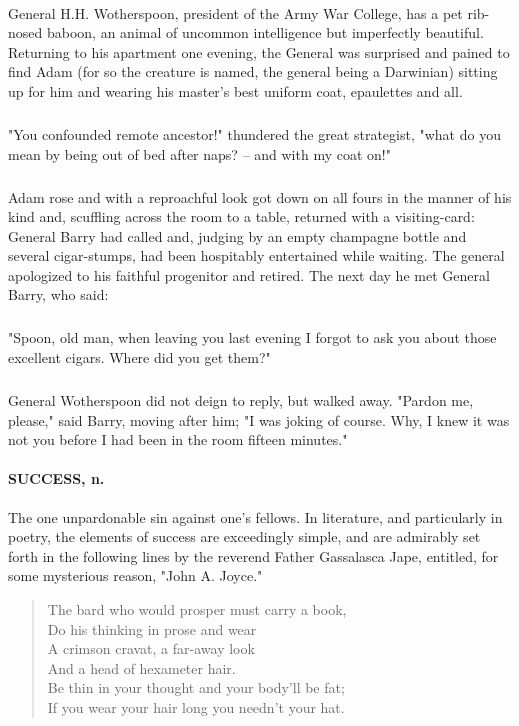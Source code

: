 \documentclass[11pt]{article}
\begin{document}
\paragraph{}   General H.H. Wotherspoon, president of the Army War College, has a 
pet rib-nosed baboon, an animal of uncommon intelligence but 
imperfectly beautiful.  Returning to his apartment one evening, the
General was surprised and pained to find Adam (for so the creature is
named, the general being a Darwinian) sitting up for him and wearing
his master's best uniform coat, epaulettes and all.
\subparagraph{}   "You confounded remote ancestor!" thundered the great strategist, 
"what do you mean by being out of bed after naps? -- and with my coat 
on!"
\subparagraph{}   Adam rose and with a reproachful look got down on all fours in the 
manner of his kind and, scuffling across the room to a table, returned 
with a visiting-card:  General Barry had called and, judging by an
empty champagne bottle and several cigar-stumps, had been hospitably
entertained while waiting.  The general apologized to his faithful
progenitor and retired.  The next day he met General Barry, who said:
\subparagraph{}   "Spoon, old man, when leaving you last evening I forgot to ask you 
about those excellent cigars.  Where did you get them?" 
\subparagraph{}   General Wotherspoon did not deign to reply, but walked away. 
  "Pardon me, please," said Barry, moving after him; "I was joking 
of course.  Why, I knew it was not you before I had been in the room 
fifteen minutes."

\paragraph{SUCCESS, n.}  The one unpardonable sin against one's fellows.  In
literature, and particularly in poetry, the elements of success are
exceedingly simple, and are admirably set forth in the following lines
by the reverend Father Gassalasca Jape, entitled, for some mysterious
reason, "John A. Joyce."

\begin{quote}   The bard who would prosper must carry a book, \\
      Do his thinking in prose and wear \\
  A crimson cravat, a far-away look \\
      And a head of hexameter hair. \\
  Be thin in your thought and your body'll be fat; \\
  If you wear your hair long you needn't your hat.  \end{quote}
\end{document}
